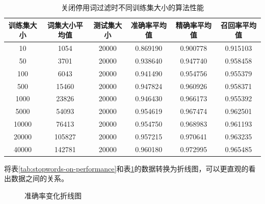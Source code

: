 \documentclass[UTF8,zihao=-4]{ctexart}
\begin{document}
	\begin{table}[!htpb]
		\centering
		\caption{关闭停用词过滤时不同训练集大小的算法性能}
		\label{tab:stopwords-off-performance}
		\begin{tabular}{|c|c|c|c|c|c|}
			\hline
			训练集大小&词集大小平均值&测试集大小&准确率平均值&精确率平均值&召回率平均值\\
			\hline
			10&1054&20000&0.869190&0.900778&0.915103\\
			\hline
			50&3701&20000&0.938640&0.947740&0.958458\\
			\hline
			100&6043&20000&0.941490&0.954756&0.955379\\
			\hline
			500&15460&20000&0.947824&0.960926&0.958371\\
			\hline
			1000&23826&20000&0.946430&0.966173&0.955392\\
			\hline
			5000&54093&20000&0.954619&0.967474&0.962501\\
			\hline
			10000&76413&20000&0.954750&0.968983&0.961193\\
			\hline
			20000&105827&20000&0.957215&0.970641&0.963235\\
			\hline
			40000&142781&20000&0.960180&0.972995&0.965485\\
			\hline
		\end{tabular}
	\end{table}

	将表\ref{tab:stopwords-on-performance}和表\ref{tab:stopwords-off-performance}的数据转换为折线图，可以更直观的看出数据之间的关系。
	
	\begin{figure}[H]
		\centering
	\caption{准确率变化折线图}	\label{fig:accuracy-axis}
	\end{figure}
\end{document}
